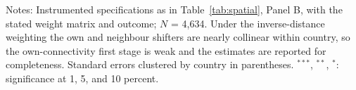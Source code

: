 \begin{table}[htbp]
\begin{threeparttable}
\begin{tabular}{lcccccc}
\bottomrule
\end{tabular}
\begin{tablenotes}[flushleft]
\scriptsize
\item Notes: Instrumented specifications as in Table~\ref{tab:spatial}, Panel B, with the stated weight matrix and outcome; $N$ = 4,634. Under the inverse-distance weighting the own and neighbour shifters are nearly collinear within country, so the own-connectivity first stage is weak and the estimates are reported for completeness. Standard errors clustered by country in parentheses. $^{***}$, $^{**}$, $^{*}$: significance at 1, 5, and 10 percent.
\end{tablenotes}
\end{threeparttable}
\end{table}

